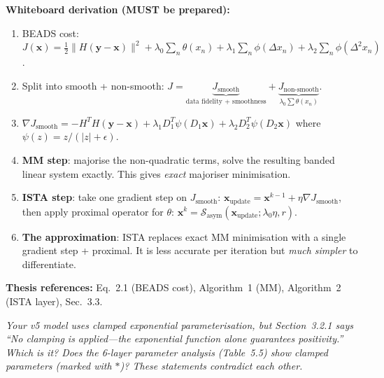 \documentclass[11pt, letterpaper]{article}
\newcounter{qcounter}
\newcommand{\question}[1]{%
  \stepcounter{qcounter}%
  \begin{questionbox}[Q\theqcounter]%
    \itshape #1%
  \end{questionbox}%
}
\begin{document}
\begin{answerbox}
\textbf{Whiteboard derivation (MUST be prepared):}
\begin{enumerate}[nosep]
  \item BEADS cost: $J(\mathbf{x}) = \tfrac{1}{2}\|H(\mathbf{y} - \mathbf{x})\|^2
        + \lambda_0 \sum_n \theta(x_n) + \lambda_1 \sum_n \phi(\Delta x_n)
        + \lambda_2 \sum_n \phi(\Delta^2 x_n)$.
  \item Split into smooth + non-smooth:
        $J = \underbrace{J_{\text{smooth}}}_{\text{data fidelity + smoothness}}
        + \underbrace{J_{\text{non-smooth}}}_{\lambda_0 \sum \theta(x_n)}$.
  \item $\nabla J_{\text{smooth}} = -H^T H(\mathbf{y} - \mathbf{x})
        + \lambda_1 D_1^T \psi(D_1 \mathbf{x})
        + \lambda_2 D_2^T \psi(D_2 \mathbf{x})$
        where $\psi(z) = z/(|z| + \epsilon)$.
  \item \textbf{MM step}: majorise the non-quadratic terms, solve the
        resulting banded linear system exactly.  This gives
        \emph{exact} majoriser minimisation.
  \item \textbf{ISTA step}: take one gradient step on $J_{\text{smooth}}$:
        $\mathbf{x}_{\text{update}} = \mathbf{x}^{k-1} + \eta \nabla J_{\text{smooth}}$,
        then apply proximal operator for $\theta$:
        $\mathbf{x}^k = \mathcal{S}_{\text{asym}}(\mathbf{x}_{\text{update}};
        \lambda_0 \eta, r)$.
  \item \textbf{The approximation}: ISTA replaces exact MM
        minimisation with a single gradient step + proximal.  It is
        less accurate per iteration but \emph{much simpler} to
        differentiate.
\end{enumerate}
\textbf{Thesis references:} Eq.~2.1 (BEADS cost), Algorithm~1 (MM), Algorithm~2 (ISTA layer), Sec.~3.3.
\end{answerbox}

\question{Your v5 model uses clamped exponential parameterisation, but
Section~3.2.1 says ``No clamping is applied---the exponential
function alone guarantees positivity.''  Which is it?  Does the
6-layer parameter analysis (Table~5.5) show clamped parameters
(marked with $*$)?  These statements contradict each other.}
\end{document}
